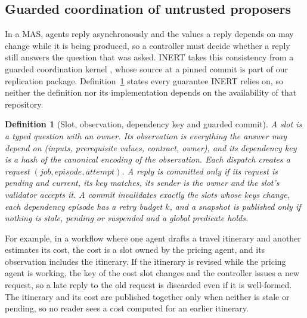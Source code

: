 \documentclass[pdflatex,sn-mathphys-num]{sn-jnl}
\theoremstyle{thmstyleone}%
\theoremstyle{thmstyletwo}%
\theoremstyle{thmstylethree}%
\newtheorem{definition}{Definition}%
\begin{document}
\subsection{Guarded coordination of untrusted proposers}\label{sec:bg-kernel}

In a MAS, agents reply asynchronously and the values a reply depends on may change while it is being produced, so a controller must decide whether a reply still answers the question that was asked. INERT takes this consistency from a guarded coordination kernel \citep{vgc2026repo}, whose source at a pinned commit is part of our replication package. Definition~\ref{def:key} states every guarantee INERT relies on, so neither the definition nor its implementation depends on the availability of that repository.

\begin{definition}[Slot, observation, dependency key and guarded commit]\label{def:key}
A \emph{slot} is a typed question with an owner. Its \emph{observation} is everything the answer may depend on (inputs, prerequisite values, contract, owner), and its \emph{dependency key} is a hash of the canonical encoding of the observation. Each dispatch creates a \emph{request} $(\mathit{job}, \mathit{episode}, \mathit{attempt})$. A reply is \emph{committed} only if its request is pending and current, its key matches, its sender is the owner and the slot's validator accepts it. A commit invalidates exactly the slots whose keys change, each dependency episode has a retry budget $k$, and a snapshot is \emph{published} only if nothing is stale, pending or suspended and a global predicate holds.
\end{definition}

For example, in a workflow where one agent drafts a travel itinerary and another estimates its cost, the cost is a slot owned by the pricing agent, and its observation includes the itinerary. If the itinerary is revised while the pricing agent is working, the key of the cost slot changes and the controller issues a new request, so a late reply to the old request is discarded even if it is well-formed. The itinerary and its cost are published together only when neither is stale or pending, so no reader sees a cost computed for an earlier itinerary.
\end{document}
